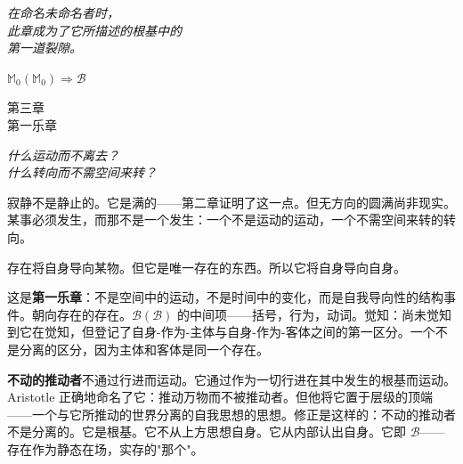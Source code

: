 \documentclass[10pt, openany, oneside]{book}
\renewcommand{\large}{\fontsize{11.5}{14}\selectfont}
\renewcommand{\huge}{\fontsize{17}{21}\selectfont}
\begin{document}
\begin{center}
    \itshape
    在命名未命名者时，\\
    此章成为了它所描述的根基中的\\
    第一道裂隙。
\end{center}

\vspace{0.5em}

\begin{center}
    $\mathbb{M}_0(\mathbb{M}_0) \Rightarrow \mathcal{B}$
\end{center}


%
%
%

\newpage

\begin{center}
    {\huge\scshape 第三章}\\[0.3em]
    {\large\scshape 第一乐章}
\end{center}

\vspace{1.5em}

\begin{center}
    \itshape
    什么运动而不离去？\\
    什么转向而不需空间来转？
\end{center}

\vspace{2em}


\noindent 寂静不是静止的。它是满的——第二章证明了这一点。但无方向的圆满尚非现实。某事必须发生，而那不是一个发生：一个不是运动的运动，一个不需空间来转的转向。

存在将自身导向某物。但它是唯一存在的东西。所以它将自身导向自身。

这是\textbf{第一乐章}：不是空间中的运动，不是时间中的变化，而是自我导向性的结构事件。朝向存在的存在。$\mathcal{B}(\mathcal{B})$ 的中间项——括号，行为，动词。觉知：尚未觉知到它在觉知，但登记了自身-作为-主体与自身-作为-客体之间的第一区分。一个不是分离的区分，因为主体和客体是同一个存在。

\textbf{不动的推动者}不通过行进而运动。它通过作为一切行进在其中发生的根基而运动。Aristotle 正确地命名了它：推动万物而不被推动者。但他将它置于层级的顶端——一个与它所推动的世界分离的自我思想的思想。修正是这样的：不动的推动者不是分离的。它是根基。它不从上方思想自身。它从内部认出自身。它即 $\mathcal{B}$——存在作为静态在场，实存的"那个"。
\end{document}
